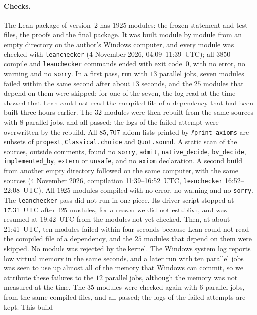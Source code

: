 \documentclass[11pt]{article}
\theoremstyle{definition}
\theoremstyle{remark}
\begin{document}
\paragraph{Checks.}
The Lean package of version~2 has $1925$ modules: the frozen statement and
test files, the proofs and the final package. It was built module by module
from an empty directory on the author's Windows computer, and every module was
checked with \texttt{leanchecker} (4 November 2026, 04:09--11:39~UTC); all
$3850$ compile and \texttt{leanchecker} commands ended with exit code~$0$,
with no error, no warning and no \texttt{sorry}. In a first pass, run
with $13$ parallel jobs, seven modules failed within the same second after
about $13$ seconds, and the $25$ modules that depend on them were skipped; for
one of the seven, the log read at the time showed that Lean could not read the
compiled file of a dependency that had been built three hours earlier. The
$32$ modules were then rebuilt from the same sources with $8$ parallel jobs,
and all passed; the logs of the failed attempt were overwritten by the
rebuild. All $85{,}707$ axiom lists
printed by \texttt{\#print axioms} are subsets of \texttt{propext},
\texttt{Classical.choice} and \texttt{Quot.sound}. A static scan of the
sources, outside comments, found no \texttt{sorry}, \texttt{admit},
\texttt{native\_decide}, \texttt{bv\_decide}, \texttt{implemented\_by},
\texttt{extern} or \texttt{unsafe}, and no \texttt{axiom} declaration.
A second build from another empty directory followed on the same computer,
with the same sources (4 November 2026, compilation 11:39--16:52~UTC,
\texttt{leanchecker} 16:52--22:08~UTC). All $1925$ modules compiled with no
error, no warning and no \texttt{sorry}. The \texttt{leanchecker} pass did not
run in one piece. Its driver script stopped at 17:31~UTC after $425$ modules,
for a reason we did not establish, and was resumed at 19:42~UTC from the
modules not yet checked. Then, at about 21:41~UTC, ten modules failed within
four seconds because Lean could not read the compiled file of a dependency,
and the $25$ modules that depend on them were skipped. No module was rejected
by the kernel. The Windows system log reports low virtual memory in the same
seconds, and a later run with ten parallel jobs was seen to use up almost all
of the memory that Windows can commit, so we attribute these failures to the
$12$ parallel jobs, although the memory was not measured at the time. The
$35$ modules were checked again with $6$ parallel jobs, from the same compiled
files, and all passed; the logs of the failed attempts are kept. This build
\end{document}
